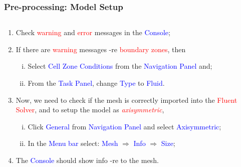 \documentclass[10pt,compress, unknownkeysallowed]{beamer}
\newcommand{\red}{\textcolor{red}}
\newcommand{\blue}{\textcolor{blue}}
\begin{document}
\begin{frame}
  \frametitle{Pre-processing: Model Setup}
    \begin{columns}
        \begin{column}[l]{0.4\linewidth}
           \begin{enumerate}\scriptsize\setcounter{enumi}{2}
               \item<1-> Check \red{warning} and \red{error} messages in the \blue{Console};  
               \item<2-> If there are \red{warning} messages -re \red{boundary zones}, then 
                    \begin{enumerate}[i)]\scriptsize
                        \item<2-> Select \blue{Cell Zone Conditions} from the \blue{Navigation Panel} and;
                        \item<2-> From the \blue{Task Panel}, change \blue{Type} to \blue{Fluid}.
                   \end{enumerate}  
               \item<3-> Now, we need to check if the mesh is correctly imported into the \red{Fluent Solver}, and to setup the model as {\it \red{axisymmetric}},
                    \begin{enumerate}[i)]\scriptsize
                        \item<3-> Click \blue{General} from \blue{Navigation Panel} and select \blue{Axisymmetric};
                        \item<3-> In the \blue{Menu bar} select: \blue{Mesh} $\Rightarrow$ \blue{Info} $\Rightarrow$ \blue{Size};
                   \end{enumerate}  
               \item<4-> The \blue{Console} should show info -re to the mesh. 
           \end{enumerate}
        \end{column}
           \begin{column}[l]{0.6\linewidth}
\end{column}
\end{columns}
\end{frame}
\end{document}
